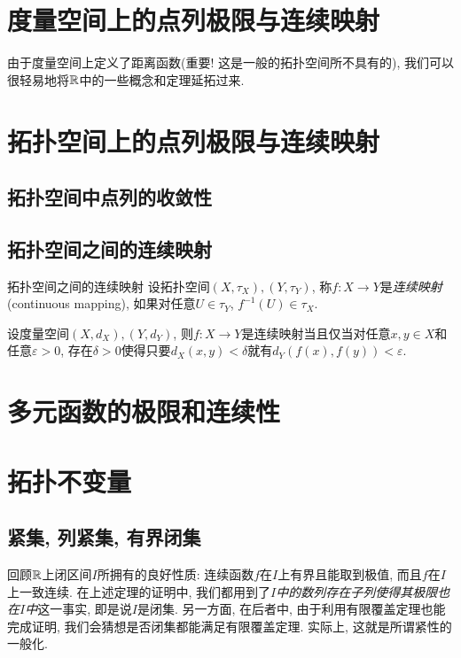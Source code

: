 \newpage
\section{度量空间上的点列极限与连续映射}

由于度量空间上定义了距离函数(重要! 这是一般的拓扑空间所不具有的), 我们可以很轻易地将$\mathbb{R}$中的一些概念和定理延拓过来. 

\newpage
\section{拓扑空间上的点列极限与连续映射}




\subsection{拓扑空间中点列的收敛性}

\subsection{拓扑空间之间的连续映射}

\begin{definition}{拓扑空间之间的连续映射}
	设拓扑空间$(X,\tau _X),(Y,\tau _Y)$, 称$f: X \to Y$是\textit{连续映射}(continuous mapping), 如果对任意$U \in \tau _Y$, $f^{-1}(U) \in \tau _X$. 
\end{definition}

\begin{proposition}{}
	设度量空间$(X,d_X),(Y,d_Y)$, 则$f:X \to Y$是连续映射当且仅当对任意$x,y \in X$和任意$\varepsilon >0$, 存在$\delta >0$使得只要$d_X(x,y)<\delta$就有$d_Y(f(x),f(y))<\varepsilon$. 
\end{proposition}

\newpage
\section{多元函数的极限和连续性}

\newpage
\section{拓扑不变量}

\subsection{紧集, 列紧集, 有界闭集}

回顾$\mathbb{R}$上闭区间$I$所拥有的良好性质: 连续函数$f$在$I$上有界且能取到极值, 而且$f$在$I$上一致连续. 在上述定理的证明中, 我们都用到了\textit{$I$中的数列存在子列使得其极限也在$I$中}这一事实, 即是说$I$是闭集. 另一方面, 在后者中, 由于利用有限覆盖定理也能完成证明, 我们会猜想是否闭集都能满足有限覆盖定理. 实际上, 这就是所谓紧性的一般化. 

